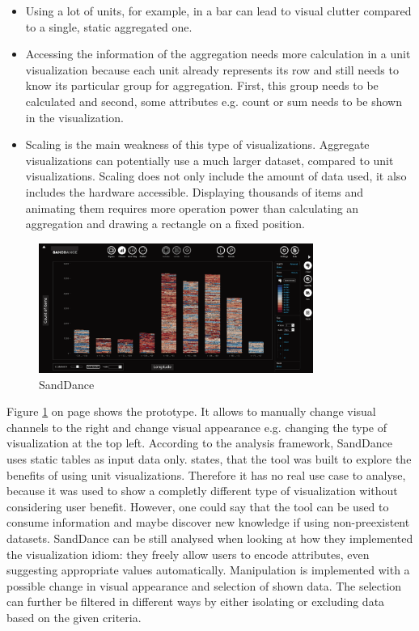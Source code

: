 \begin{itemize}
\item Using a lot of units, for example, in a bar can lead to visual clutter compared to a single, static aggregated one.

\item Accessing the information of the aggregation needs more calculation in a unit visualization because each unit already represents its row and still needs to know its particular group for aggregation. First, this group needs to be calculated and second, some attributes e.g. count or sum needs to be shown in the visualization.

\item Scaling is the main weakness of this type of visualizations. Aggregate visualizations can potentially use a much larger dataset, compared to unit visualizations. Scaling does not only include the amount of data used, it also includes the hardware accessible. Displaying thousands of items and animating them requires more operation power than calculating an aggregation and drawing a rectangle on a fixed position.

\end{itemize}

\begin{figure}[!htb]
\centering
\includegraphics[width=0.8\textwidth,keepaspectratio]{images/methods/related/sanddance.png}
\caption[
    Concept of SandDance .
]{SandDance}
\label{fig:sanddance}
\end{figure}

Figure \ref{fig:sanddance} on page \pageref{fig:sanddance} shows the prototype. It allows to manually change visual channels to the right and change visual appearance e.g. changing the type of visualization at the top left. According to the analysis framework, SandDance uses static tables as input data only. \citeauthor{Drucker2015} states, that the tool was built to explore the benefits of using unit visualizations. Therefore it has no real use case to analyse, because it was used to show a completly different type of visualization without considering user benefit. However, one could say that the tool can be used to consume information and maybe discover new knowledge if using non-preexistent datasets.
SandDance can be still analysed when looking at how they implemented the visualization idiom: they freely allow users to encode attributes, even suggesting appropriate values automatically. Manipulation is implemented with a possible change in visual appearance and selection of shown data. The selection can further be filtered in different ways by either isolating or excluding data based on the given criteria.